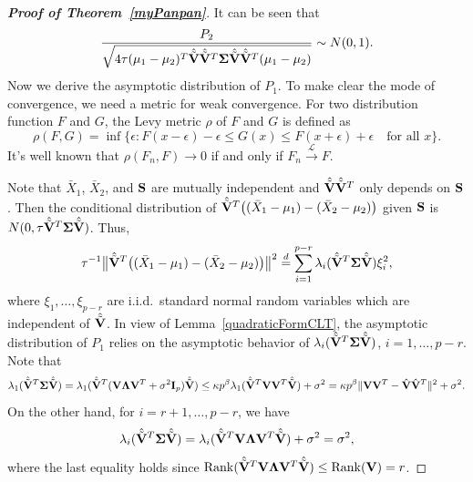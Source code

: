 \documentclass[3p]{elsarticle}
\DeclareMathOperator{\myrank}{Rank}
\theoremstyle{plain}
\theoremstyle{definition}
\theoremstyle{remark}
\begin{document}
\begin{appendices}
\begin{proof}[\textbf{Proof of Theorem~\ref{myPanpan}}]
   It can be seen that
   $$
   \frac{P_2}{\sqrt{4\tau (\mu_1-\mu_2)^T \hat{\tilde{\mathbf{V}}}\hat{\tilde{\mathbf{V}}}^T \boldsymbol{\Sigma}\hat{\tilde{\mathbf{V}}}\hat{\tilde{\mathbf{V}}}^T (\mu_1-\mu_2)}} \sim N(0,1).
   $$
    Now we derive the asymptotic distribution of $P_1$.
    To make clear the mode of convergence, we need a metric for weak convergence. For two distribution function $F$ and $G$, the Levy metric $\rho$ of $F$ and $G$ is defined as
    $$
   \rho(F,G) =\inf\{\epsilon:F(x-\epsilon)-\epsilon\leq G(x)\leq F(x+\epsilon)+\epsilon\quad \textrm{for all $x$}\}.
    $$
    It's well known that $\rho(F_n,F)\to 0$ if and only if $F_n\xrightarrow{\mathcal{L}}F$.


    Note that $\bar{X}_1$, $\bar{X}_2$, and $\mathbf{S}$ are mutually independent and $\hat{\tilde{\mathbf{V}}}\hat{\tilde{\mathbf{V}}}^T$ only depends on $\mathbf{S}$.
    Then the conditional distribution of
    $\hat{\tilde{\mathbf{V}}}^T\big((\bar{X}_1-\mu_1)-(\bar{X}_2-\mu_2)\big)$ given $\mathbf{S}$ is $N(0,\tau \hat{\tilde{\mathbf{V}}}^T\boldsymbol{\Sigma}\hat{\tilde{\mathbf{V}}})$.
    Thus,
\begin{equation}\label{houjia2}
\tau^{-1}\big\|\hat{\tilde{\mathbf{V}}}^T\big((\bar{X}_1-\mu_1)-(\bar{X}_2-\mu_2)\big)\big\|^2
    \overset{d}{=}
    \sum_{i=1}^{p-r} \lambda_i(\hat{\tilde{\mathbf{V}}}^T\boldsymbol{\Sigma}\hat{\tilde{\mathbf{V}}})\xi_i^2,
\end{equation}
where $\xi_1,\ldots,\xi_{p-r}$ are i.i.d.\  standard normal random variables which are independent of $\hat{\tilde{\mathbf{V}}}$.
    In view of Lemma~\ref{quadraticFormCLT}, the asymptotic distribution of $P_1$ relies on the asymptotic behavior of $\lambda_i(\hat{\tilde{\mathbf{V}}}^T\boldsymbol{\Sigma}\hat{\tilde{\mathbf{V}}})$, $i=1,\ldots, p-r$.
     Note that
     \begin{equation}\label{houjia1}
     \lambda_1(\hat{\tilde{\mathbf{V}}}^T\boldsymbol{\Sigma}\hat{\tilde{\mathbf{V}}})
             =
             \lambda_1(\hat{\tilde{\mathbf{V}}}^T (\mathbf{V}\boldsymbol{\Lambda} \mathbf{V}^T +\sigma^2 \mathbf{I}_p) \hat{\tilde{\mathbf{V}}})
         \leq 
     \kappa p^{\beta}\lambda_1(\hat{\tilde{\mathbf{V}}}^T \mathbf{V} \mathbf{V}^T\hat{\tilde{\mathbf{V}}})+\sigma^2
     =
    \kappa p^\beta \|\mathbf{V}\mathbf{V}^T -\hat{\mathbf{V}}\hat{\mathbf{V}}^T\|^2+\sigma^2.
     \end{equation}
    On the other hand,
    for $i=r+1,\ldots,p-r$,
    we have
    \begin{equation}\label{houjia3}
    \lambda_i(\hat{\tilde{\mathbf{V}}}^T\boldsymbol{\Sigma}\hat{\tilde{\mathbf{V}}})
    =
    \lambda_i(\hat{\tilde{\mathbf{V}}}^T \mathbf{V} \boldsymbol{\Lambda} \mathbf{V}^T \hat{\tilde{\mathbf{V}}})+\sigma^2
    =\sigma^2,
    \end{equation}
where the last equality holds since $\myrank(\hat{\tilde{\BV}}^T \BV \bLambda \BV^T \hat{\tilde{\BV}})\leq \myrank(\BV)=r$.

\end{proof}
\end{appendices}
\end{document}
